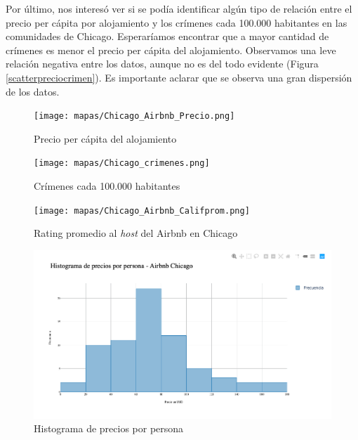 \documentclass[12pt]{article}
\begin{document}
Por último, nos interesó ver si se podía identificar algún tipo de relación entre el precio per cápita por alojamiento y los crímenes cada 100.000 habitantes en las comunidades de Chicago. Esperaríamos encontrar que a mayor cantidad de crímenes es menor el precio per cápita del alojamiento. Observamos una leve relación negativa entre los datos, aunque no es del todo evidente (Figura \ref{scatterpreciocrimen}). Es importante aclarar que se observa una gran dispersión de los datos. 









\begin{figure}
    \centering
    \texttt{[image: mapas/Chicago\_Airbnb\_Precio.png]}    \caption{Precio per c\'apita del alojamiento}
    \label{precioairbnb}
\end{figure}

\begin{figure}
    \centering
    \texttt{[image: mapas/Chicago\_crimenes.png]}    \caption{Cr\'imenes cada 100.000 habitantes}
    \label{crimeneschicago}
\end{figure}

\begin{figure}
    \centering
    \texttt{[image: mapas/Chicago\_Airbnb\_Califprom.png]}   
    \caption{Rating promedio al \textit{host} del Airbnb en Chicago}
    \label{califairbnb}
\end{figure}



\begin{figure}
    \centering
    \includegraphics[width = \textwidth]{mapas/Chicago_Hist_Precio.png}   
    \caption{Histograma de precios por persona}
    \label{histprecios}
\end{figure}
\end{document}
